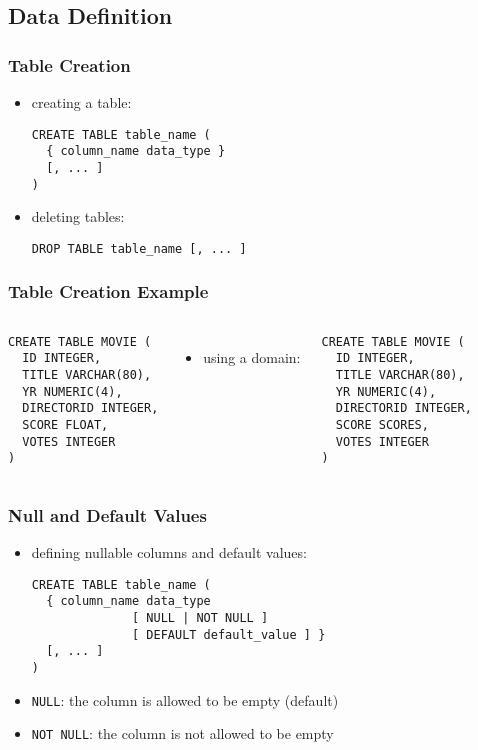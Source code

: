 \documentclass[dvipsnames]{beamer}
\theoremstyle{plain}
\begin{document}
\subsection{Data Definition}

\begin{frame}[fragile]
  \frametitle{Table Creation}

  \begin{itemize}
    \item creating a table:
    \begin{lstlisting}
CREATE TABLE table_name (
  { column_name data_type }
  [, ... ]
)
    \end{lstlisting}

    \item deleting tables:
    \begin{lstlisting}
DROP TABLE table_name [, ... ]
    \end{lstlisting}
  \end{itemize}
\end{frame}

\begin{frame}[fragile]
  \frametitle{Table Creation Example}

  \begin{columns}[b]
    \begin{lstlisting}
CREATE TABLE MOVIE (
  ID INTEGER,
  TITLE VARCHAR(80),
  YR NUMERIC(4),
  DIRECTORID INTEGER,
  SCORE FLOAT,
  VOTES INTEGER
)
    \end{lstlisting}

    \pause
    \begin{itemize}
      \item using a domain:
    \end{itemize}

    \begin{lstlisting}
CREATE TABLE MOVIE (
  ID INTEGER,
  TITLE VARCHAR(80),
  YR NUMERIC(4),
  DIRECTORID INTEGER,
  SCORE SCORES,
  VOTES INTEGER
)
    \end{lstlisting}
  \end{columns}
\end{frame}

\begin{frame}[fragile]
  \frametitle{Null and Default Values}

  \begin{itemize}
    \item defining nullable columns and default values:
    \begin{lstlisting}
CREATE TABLE table_name (
  { column_name data_type
              [ NULL | NOT NULL ]
              [ DEFAULT default_value ] }
  [, ... ]
)
    \end{lstlisting}

    \item \texttt{NULL}: the column is allowed to be empty (default)
    \item \texttt{NOT NULL}: the column is not allowed to be empty
  \end{itemize}
\end{frame}
\end{document}
